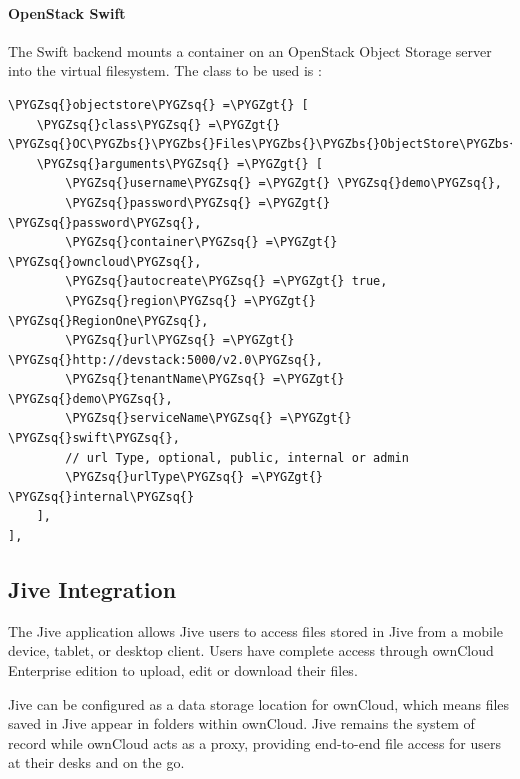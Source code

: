 \documentclass[letterpaper,10pt,english]{sphinxmanual}
\def\PYGZbs{\char`\\}
\def\PYGZgt{\char`\>}
\def\PYGZsq{\char`\'}
\begin{document}
\paragraph{OpenStack Swift}
\label{enterprise_external_storage/s3_swift_as_primary_object_store_configuration:openstack-swift}
The Swift backend mounts a container on an OpenStack Object Storage server
into the virtual filesystem. The class to be used is :

\begin{Verbatim}[commandchars=\\\{\}]
\PYGZsq{}objectstore\PYGZsq{} =\PYGZgt{} [
    \PYGZsq{}class\PYGZsq{} =\PYGZgt{} \PYGZsq{}OC\PYGZbs{}\PYGZbs{}Files\PYGZbs{}\PYGZbs{}ObjectStore\PYGZbs{}\PYGZbs{}Swift\PYGZsq{},
    \PYGZsq{}arguments\PYGZsq{} =\PYGZgt{} [
        \PYGZsq{}username\PYGZsq{} =\PYGZgt{} \PYGZsq{}demo\PYGZsq{},
        \PYGZsq{}password\PYGZsq{} =\PYGZgt{} \PYGZsq{}password\PYGZsq{},
        \PYGZsq{}container\PYGZsq{} =\PYGZgt{} \PYGZsq{}owncloud\PYGZsq{},
        \PYGZsq{}autocreate\PYGZsq{} =\PYGZgt{} true,
        \PYGZsq{}region\PYGZsq{} =\PYGZgt{} \PYGZsq{}RegionOne\PYGZsq{},
        \PYGZsq{}url\PYGZsq{} =\PYGZgt{} \PYGZsq{}http://devstack:5000/v2.0\PYGZsq{},
        \PYGZsq{}tenantName\PYGZsq{} =\PYGZgt{} \PYGZsq{}demo\PYGZsq{},
        \PYGZsq{}serviceName\PYGZsq{} =\PYGZgt{} \PYGZsq{}swift\PYGZsq{},
        // url Type, optional, public, internal or admin
        \PYGZsq{}urlType\PYGZsq{} =\PYGZgt{} \PYGZsq{}internal\PYGZsq{}
    ],
],
\end{Verbatim}


\subsection{Jive Integration}
\label{enterprise_external_storage/jive_configuration:jive-integration}\label{enterprise_external_storage/jive_configuration::doc}
The Jive application allows Jive users to access files stored in Jive
from a mobile device, tablet, or desktop client. Users have complete access
through ownCloud Enterprise edition to upload, edit or download their files.

Jive can be configured as a data storage location for ownCloud, which means
files saved in Jive appear in folders within ownCloud. Jive remains the system
of record while ownCloud acts as a proxy, providing end-to-end file access for
users at their desks and on the go.
\end{document}
